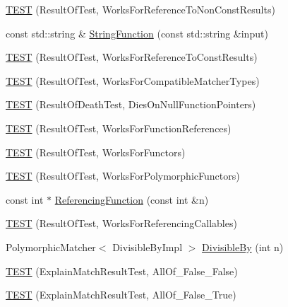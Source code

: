 \begin{DoxyCompactItemize}
\item 
\mbox{\hyperlink{namespacetesting_1_1gmock__matchers__test_a505e866c4066d27854cb6754c66a3eec}{T\+E\+ST}} (Result\+Of\+Test, Works\+For\+Reference\+To\+Non\+Const\+Results)
\item 
const std\+::string \& \mbox{\hyperlink{namespacetesting_1_1gmock__matchers__test_abe0b3ba3be22e6b973ac6aa226ae85f3}{String\+Function}} (const std\+::string \&input)
\item 
\mbox{\hyperlink{namespacetesting_1_1gmock__matchers__test_a17b952cce22be6338fb1369f886d61c4}{T\+E\+ST}} (Result\+Of\+Test, Works\+For\+Reference\+To\+Const\+Results)
\item 
\mbox{\hyperlink{namespacetesting_1_1gmock__matchers__test_a1aceb307c843f0f5532053e390a7c654}{T\+E\+ST}} (Result\+Of\+Test, Works\+For\+Compatible\+Matcher\+Types)
\item 
\mbox{\hyperlink{namespacetesting_1_1gmock__matchers__test_a4c929e5b46a503a9bb48c8b88dcbbf2a}{T\+E\+ST}} (Result\+Of\+Death\+Test, Dies\+On\+Null\+Function\+Pointers)
\item 
\mbox{\hyperlink{namespacetesting_1_1gmock__matchers__test_a1638ee6460100cbe21c65b6cdc06579a}{T\+E\+ST}} (Result\+Of\+Test, Works\+For\+Function\+References)
\item 
\mbox{\hyperlink{namespacetesting_1_1gmock__matchers__test_a19b7a39915f7ad5a0b741caf7ae4e619}{T\+E\+ST}} (Result\+Of\+Test, Works\+For\+Functors)
\item 
\mbox{\hyperlink{namespacetesting_1_1gmock__matchers__test_a976290e53e319b06c51a94f7e450d765}{T\+E\+ST}} (Result\+Of\+Test, Works\+For\+Polymorphic\+Functors)
\item 
const int $\ast$ \mbox{\hyperlink{namespacetesting_1_1gmock__matchers__test_af3164fc302e0b727c1eb745bdeb959f6}{Referencing\+Function}} (const int \&n)
\item 
\mbox{\hyperlink{namespacetesting_1_1gmock__matchers__test_a00ee08657c9e9e0c306be7b84cd2848c}{T\+E\+ST}} (Result\+Of\+Test, Works\+For\+Referencing\+Callables)
\item 
Polymorphic\+Matcher$<$ Divisible\+By\+Impl $>$ \mbox{\hyperlink{namespacetesting_1_1gmock__matchers__test_ac5b1fd3b6a8141c7e83ef6040ed4630f}{Divisible\+By}} (int n)
\item 
\mbox{\hyperlink{namespacetesting_1_1gmock__matchers__test_aa9a60a406d9f495de8c8552abf577dd1}{T\+E\+ST}} (Explain\+Match\+Result\+Test, All\+Of\+\_\+\+False\+\_\+\+False)
\item 
\mbox{\hyperlink{namespacetesting_1_1gmock__matchers__test_a099aebb5417d5bd85e11aefe935ec345}{T\+E\+ST}} (Explain\+Match\+Result\+Test, All\+Of\+\_\+\+False\+\_\+\+True)

\end{DoxyCompactItemize}
